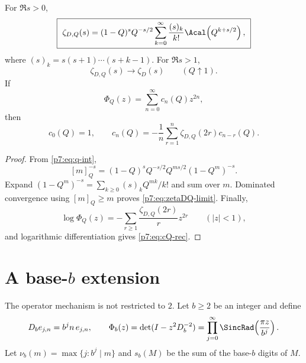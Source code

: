 \documentclass[11pt]{article}
\numberwithin{equation}{section}
\theoremstyle{definition}
\theoremstyle{remark}
\begin{document}
\begin{proposition}\label{p7:prop:zetaDQ}
For $\Re s>0$,
\begin{equation}\label{p7:eq:zetaDQ-Lambert}
 \boxed{\ \zeta_{D,Q}(s)
 =(1-Q)^sQ^{-s/2}
 \sum_{k=0}^{\infty}\frac{(s)_k}{k!}
 \Acal\!\left(Q^{k+s/2}\right),\ }
\end{equation}
where $(s)_k=s(s+1)\cdots(s+k-1)$.  For $\Re s>1$,
\begin{equation}\label{p7:eq:zetaDQ-limit}
 \zeta_{D,Q}(s)\longrightarrow\zeta_D(s)
 \qquad(Q\uparrow1).
\end{equation}
If
\[
 \Phi_Q(z)=\sum_{n=0}^{\infty}c_n(Q)z^{2n},
\]
then
\begin{equation}\label{p7:eq:cQ-rec}
 c_0(Q)=1,
 \qquad
 c_n(Q)=-\frac1n\sum_{r=1}^{n}
 \zeta_{D,Q}(2r)c_{n-r}(Q).
\end{equation}
\end{proposition}

\begin{proof}
From \cref{p7:eq:q-int},
\[
 [m]_Q^{-s}=(1-Q)^sQ^{-s/2}
 Q^{ms/2}(1-Q^m)^{-s}.
\]
Expand $(1-Q^m)^{-s}=\sum_{k\ge0}(s)_kQ^{mk}/k!$ and sum over $m$.  Dominated convergence using $[m]_Q\ge m$ proves \cref{p7:eq:zetaDQ-limit}.  Finally,
\[
 \log\Phi_Q(z)=-\sum_{r\ge1}\frac{\zeta_{D,Q}(2r)}r z^{2r}
 \qquad(|z|<1),
\]
and logarithmic differentiation gives \cref{p7:eq:cQ-rec}.
\end{proof}

\section{A base-$b$ extension}

The operator mechanism is not restricted to $2$.  Let $b\ge2$ be an integer and define
\begin{equation}\label{p7:eq:Db}
 D_b e_{j,n}=b^jn\,e_{j,n},
 \qquad
 \Phi_b(z)=\det(I-z^2D_b^{-2})
 =\prod_{j=0}^{\infty}\SincRad\!\left(\frac{\pi z}{b^j}\right).
\end{equation}
Let $\nu_b(m)=\max\{j:b^j\mid m\}$ and $s_b(M)$ be the sum of the base-$b$ digits of $M$.
\end{document}
